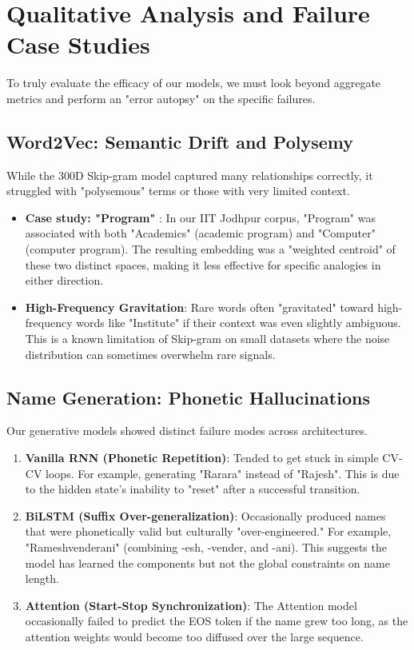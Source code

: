 \documentclass[12pt,a4paper]{article}
\begin{document}
\section{Qualitative Analysis and Failure Case Studies}
To truly evaluate the efficacy of our models, we must look beyond aggregate metrics and perform an "error autopsy" on the specific failures.

\subsection{Word2Vec: Semantic Drift and Polysemy}
While the 300D Skip-gram model captured many relationships correctly, it struggled with "polysemous" terms or those with very limited context.
\begin{itemize}
    \item \textbf{Case study: "Program"} : In our IIT Jodhpur corpus, "Program" was associated with both "Academics" (academic program) and "Computer" (computer program). The resulting embedding was a "weighted centroid" of these two distinct spaces, making it less effective for specific analogies in either direction.
    \item \textbf{High-Frequency Gravitation}: Rare words often "gravitated" toward high-frequency words like "Institute" if their context was even slightly ambiguous. This is a known limitation of Skip-gram on small datasets where the noise distribution can sometimes overwhelm rare signals.
\end{itemize}

\subsection{Name Generation: Phonetic Hallucinations}
Our generative models showed distinct failure modes across architectures.
\begin{enumerate}
    \item \textbf{Vanilla RNN (Phonetic Repetition)}: Tended to get stuck in simple CV-CV loops. For example, generating "Rarara" instead of "Rajesh". This is due to the hidden state's inability to "reset" after a successful transition.
    \item \textbf{BiLSTM (Suffix Over-generalization)}: Occasionally produced names that were phonetically valid but culturally "over-engineered." For example, "Rameshvenderani" (combining -esh, -vender, and -ani). This suggests the model has learned the components but not the global constraints on name length.
    \item \textbf{Attention (Start-Stop Synchronization)}: The Attention model occasionally failed to predict the EOS token if the name grew too long, as the attention weights would become too diffused over the large sequence.
\end{enumerate}
\end{document}
